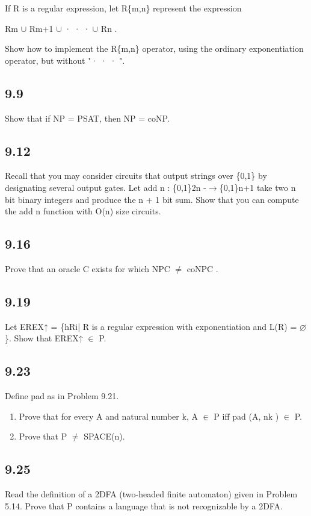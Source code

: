 If R is a regular expression, let R\{m,n\} represent the expression

Rm $\cup$ Rm+1 $\cup$ · · · $\cup$ Rn .

Show how to implement the R\{m,n\} operator, using the ordinary exponentiation operator, but without "· · · ".


\subsection*{9.9}

Show that if NP = PSAT, then NP = coNP.


\subsection*{9.12}

Recall that you may consider circuits that output strings over \{0,1\} by designating several output gates. Let add n : \{0,1\}2n -$\to$\{0,1\}n+1 take two n bit binary integers and produce the n + 1 bit sum. Show that you can compute the add n function with O(n) size circuits.


\subsection*{9.16}

Prove that an oracle C exists for which NPC $\neq$ coNPC .


\subsection*{9.19}

Let EREX↑ = \{hRi| R is a regular expression with exponentiation and L(R) = $\varnothing$\}. Show that EREX↑ $\in$ P.


\subsection*{9.23}

Define pad as in Problem 9.21.

\begin{enumerate}[label=(\alph*), leftmargin=2.5em]

\item Prove that for every A and natural number k, A $\in$ P iff pad (A, nk ) $\in$ P.

\item Prove that P $\neq$ SPACE(n).

\end{enumerate}


\subsection*{9.25}

Read the definition of a 2DFA (two-headed finite automaton) given in Problem 5.14. Prove that P contains a language that is not recognizable by a 2DFA.


\clearpage

